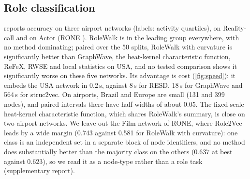 \documentclass[10pt]{article}
\theoremstyle{definition}
\begin{document}
\subsection{Role classification}

 reports accuracy on three airport networks (labels: activity quartiles), on Reality-call and on Actor (RONE \citep{rone}).
RoleWalk is in the leading group everywhere, with no method dominating; paired over the 50 splits, RoleWalk with curvature is significantly better than GraphWave, the heat-kernel characteristic function, ReFeX, RWSE and local statistics on USA, and no tested comparison shows it significantly worse on these five networks.
Its advantage is cost (\cref{fig:speed}): it embeds the USA network in 0.2\,s, against 8\,s for RESD, 18\,s for GraphWave and 564\,s for struc2vec.
On airports, Brazil and Europe are small (131 and 399 nodes), and paired intervals there have half-widths of about 0.05. The fixed-scale heat-kernel characteristic function, which shares RoleWalk's summary, is close on two airport networks. We leave out the Film network of RONE, where Role2Vec leads by a wide margin (0.743 against 0.581 for RoleWalk with curvature): one class is an independent set in a separate block of node identifiers, and no method does substantially better than the majority class on the others (0.637 at best against 0.623), so we read it as a node-type rather than a role task (supplementary report).
\end{document}
